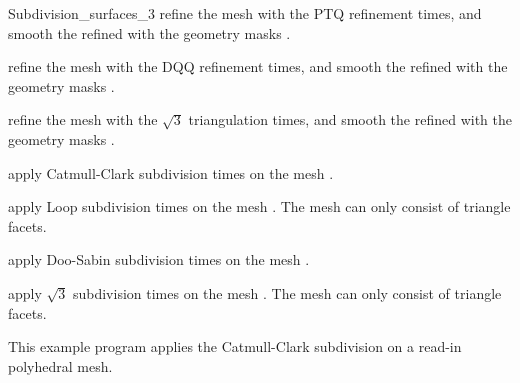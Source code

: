 \begin{ccRefClass}{Subdivision_surfaces_3}
{refine the mesh  with the PTQ refinement 
 times, and smooth the refined  with the geometry 
masks .}

{refine the mesh  with the DQQ refinement 
 times, and smooth the refined  with the geometry 
masks .}

{refine the mesh  with the $\sqrt{3}$ triangulation 
 times, and smooth the refined  with the geometry 
masks .}


\ccThree{}{}{}

{apply Catmull-Clark subdivision  times on the mesh .}

{apply Loop subdivision  times on the mesh . 
The mesh  can only consist of triangle facets.}

{apply Doo-Sabin subdivision  times on the mesh .}

{apply $\sqrt{3}$ subdivision  times on the mesh .
The mesh  can only consist of triangle facets.}

\ccExample

This example program applies the Catmull-Clark subdivision on a
read-in polyhedral mesh.


\ccSeeAlso

\\
\\
\\
\\
\\
\\

\end{ccRefClass}

\ccRefPageEnd

